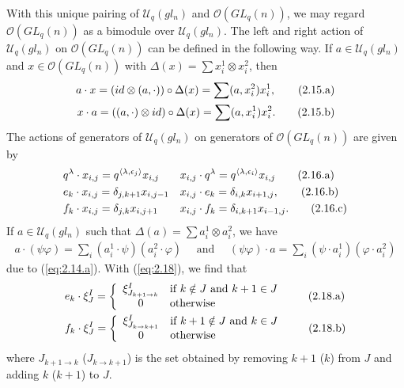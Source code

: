 \documentclass[table,a4paper,reqno]{amsart}
\numberwithin{equation}{section}
\theoremstyle{definition}
\begin{document}
With this unique pairing of $\mathcal{U}_q(gl_n)$ and $\mathcal{O}(GL_q(n))$, we may regard $\mathcal{O}(GL_q(n))$ as a bimodule over $\mathcal{U}_q(gl_n)$. The left and right action of $\mathcal{U}_q(gl_n)$ on $\mathcal{O}(GL_q(n))$ can be defined in the following way. If $a\in \mathcal{U}_q(gl_n)$ and $x\in \mathcal{O}(GL_q(n))$ with $\Delta(x)=\sum x_i^1\otimes x_i^2$, then
\begin{align}\stepcounter{equation}
    a\cdot x=(id\otimes (a,\cdot))\circ\Delta(x)=\sum (a,x_i^2)x_i^1,\tag{2.15.a}\label{eq:2.16.a}\\
    x\cdot a=((a,\cdot)\otimes id)\circ\Delta(x)=\sum (a,x_i^1)x_i^2.\tag{2.15.b}\label{eq:2.16.b}
\end{align}
The actions of generators of $\mathcal{U}_q(gl_n)$ on generators of $\mathcal{O}(GL_q(n))$ are given by
\begin{align}\stepcounter{equation}
    &q^\lambda\cdot x_{i,j}=q^{\langle\lambda,\epsilon_j\rangle}x_{i,j} & &x_{i,j}\cdot q^\lambda=q^{\langle\lambda,\epsilon_i\rangle}x_{i,j}\tag{2.16.a}\label{eq:2.17.a}\\ 
    &e_k\cdot x_{i,j}=\delta_{j,k+1}x_{i,j-1} & &x_{i,j}\cdot e_k=\delta_{i,k}x_{i+1,j}, \tag{2.16.b}\label{eq:2.17.b}\\  
    &f_k\cdot x_{i,j}=\delta_{j,k}x_{i,j+1} & &x_{i,j}\cdot f_k=\delta_{i,k+1}x_{i-1,j}.\tag{2.16.c}\label{eq:2.17.c}
\end{align}
If $a\in\mathcal{U}_q(gl_n)$ such that $\Delta(a)=\sum a_i^1\otimes a_i^2$, we have
\begin{align}
    a\cdot(\psi\varphi)=\sum_i(a_i^1\cdot\psi)(a_i^2\cdot\varphi)\quad\text{ and }\quad (\psi\varphi)\cdot a=\sum_i(\psi\cdot a_i^1)(\varphi\cdot a_i^2)\label{eq:2.18}
\end{align}
due to (\ref{eq:2.14.a}). With (\ref{eq:2.18}), we find that
\begin{align}\stepcounter{equation}
    &e_k\cdot\xi_J^I=\left\{ \begin{array}{cl}
        \xi_{J_{k+1\rightarrow k}}^I & \text{if } k\notin J \text{ and } k+1\in J \\
        0 & \mbox{otherwise} 
        \end{array}\right.\tag{2.18.a}\label{eq:2.19.a}\\
        &f_k\cdot\xi_J^I=\left\{ \begin{array}{cl}
        \xi_{J_{k\rightarrow k+1}}^I & \text{if } k+1\notin J \text{ and } k\in J \\
        0 & \mbox{otherwise} 
        \end{array}\right.\tag{2.18.b}\label{eq:2.19.b}
\end{align}
where $J_{k+1\rightarrow k}$ ($J_{k\rightarrow k+1}$) is the set obtained by removing $k+1$ ($k$) from $J$ and adding $k$ ($k+1$) to $J$.
\end{document}
